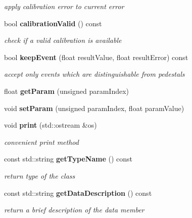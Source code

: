\begin{DoxyCompactItemize}
\begin{DoxyCompactList}\small\item\em apply calibration error to current error \item\end{DoxyCompactList}\item 
bool {\bf calibrationValid} () const \label{classCALICE_1_1PedestalConstants_a6cfd6a82fa83433d2abe95b830ae164d}

\begin{DoxyCompactList}\small\item\em check if a valid calibration is available \item\end{DoxyCompactList}\item 
bool {\bf keepEvent} (float resultValue, float resultError) const \label{classCALICE_1_1PedestalConstants_a5296ca6178fa8cebd290bcae2f39a86f}

\begin{DoxyCompactList}\small\item\em accept only events which are distinguishable from pedestals \item\end{DoxyCompactList}\item 
float {\bfseries getParam} (unsigned paramIndex)\label{classCALICE_1_1PedestalConstants_ad432e4fbd1c354798b37fa5fc609825a}

\item 
void {\bfseries setParam} (unsigned paramIndex, float paramValue)\label{classCALICE_1_1PedestalConstants_aff69422b46746ad27d06cec76dbfa3a6}

\item 
void {\bf print} (std::ostream \&os)\label{classCALICE_1_1PedestalConstants_a312e7cf9898d2b6540d0db552fa02416}

\begin{DoxyCompactList}\small\item\em convenient print method \item\end{DoxyCompactList}\item 
const std::string {\bf getTypeName} () const \label{classCALICE_1_1PedestalConstants_acdb7efb3b0197ff4881912b625b704c0}

\begin{DoxyCompactList}\small\item\em return type of the class \item\end{DoxyCompactList}\item 
const std::string {\bf getDataDescription} () const \label{classCALICE_1_1PedestalConstants_a974f370dddb3b7989563874a0eb5e8a9}

\begin{DoxyCompactList}\small\item\em return a brief description of the data member \item\end{DoxyCompactList}\end{DoxyCompactItemize}
